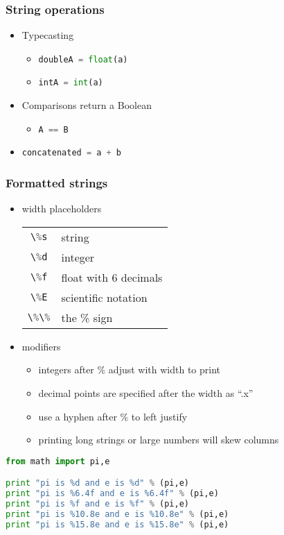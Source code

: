 \documentclass[xcolor=table,10pt,final]{beamer}
\begin{document}
\begin{frame}
  \frametitle{String operations}
  \begin{itemize}
    \item Typecasting
      \begin{itemize}
        \item \lstinline[language=Python]|doubleA = float(a)|
        \item \lstinline[language=Python]|intA = int(a)|
      \end{itemize}
    \item Comparisons return a Boolean
      \begin{itemize}
        \item \lstinline[language=Python]|A == B|
      \end{itemize}
    \item \lstinline[language=Python]|concatenated = a + b|
  \end{itemize}
\end{frame}

\begin{frame}[fragile]
  \frametitle{Formatted strings}
  \begin{itemize}
    \item width placeholders
      \begin{table}
        \begin{tabular}{cl}
          \lstinline[language=Python]|\%s| & string\\
          \lstinline[language=Python]|\%d| & integer\\
          \lstinline[language=Python]|\%f| & float with 6 decimals\\
          \lstinline[language=Python]|\%E| & scientific notation\\
          \lstinline[language=Python]|\%\%| & the \% sign
        \end{tabular}
      \end{table}
    \item modifiers
      \begin{itemize}
        \item integers after \% adjust with width to print
        \item decimal points are specified after the width as ``.x''
        \item use a hyphen after \% to left justify
        \item printing long strings or large numbers will skew columns
      \end{itemize}
  \end{itemize}
  \begin{lstlisting}[language=Python]
from math import pi,e

print "pi is %d and e is %d" % (pi,e)
print "pi is %6.4f and e is %6.4f" % (pi,e)
print "pi is %f and e is %f" % (pi,e)
print "pi is %10.8e and e is %10.8e" % (pi,e)
print "pi is %15.8e and e is %15.8e" % (pi,e)
\end{lstlisting}
\end{frame}
\end{document}
